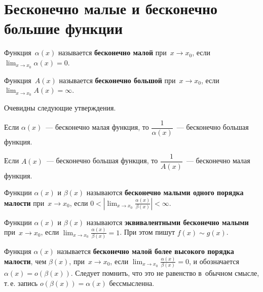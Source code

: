 \section{Бесконечно малые и бесконечно большие функции}
 Функция~$\alpha(x)$ называется \textbf{бесконечно малой} при~$x \to x_0$, если $\displaystyle \lim_{x \to x_0} \alpha(x) = 0$.

 Функция~$A(x)$ называется \textbf{бесконечно большой} при~$x \to x_0$, если $\displaystyle \lim_{x \to x_0} A(x) = \infty$.

Очевидны следующие утверждения.
\begin{statement}
Если $\alpha(x)$~--- бесконечно малая функция, то $\dfrac1{\alpha(x)}$~--- бесконечно большая функция.
\end{statement}

\begin{statement}
Если $A(x)$~--- бесконечно большая функция, то $\dfrac1{A(x)}$~--- бесконечно малая функция.
\end{statement}

Функции $\alpha(x)$ и $\beta(x)$ называются \textbf{бесконечно малыми одного порядка малости} при~$x \to x_0$, если\linebreak
$\displaystyle 0 < \left| \lim_{x \to x_0} \frac{\alpha(x)}{\beta(x)} \right| < \infty$.

Функции $\alpha(x)$ и $\beta(x)$ называются \textbf{эквивалентными бесконечно малыми} при~$x \to x_0$, если
$\displaystyle \lim_{x \to x_0} \frac{\alpha(x)}{\beta(x)} = 1$.
При этом пишут $f(x) \sim g(x)$.

Функция $\alpha(x)$ называется \textbf{бесконечно малой более высокого порядка малости}, чем $\beta(x)$, при~$x \to x_0$, если
$\displaystyle \lim_{x \to x_0} \frac{\alpha(x)}{\beta(x)} = 0$, и обозначается $\alpha(x) = o(\beta(x))$.
Следует помнить, что это не равенство в~обычном смысле, т.\,е. запись $o(\beta(x)) = \alpha(x)$ бессмысленна.